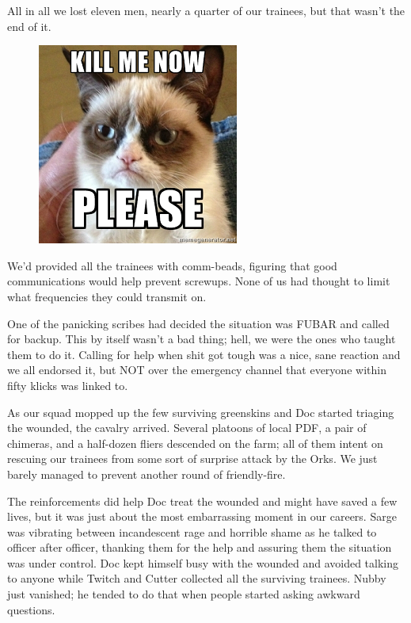All in all we lost eleven men, nearly a quarter of our trainees, but that wasn’t the end of it.

\begin{figure}
	\begin{center}
		\includegraphics[width=\figwidth]{pics/8/20.png}
	\end{center}
\end{figure}
We’d provided all the trainees with comm-beads, figuring that good communications would help prevent screwups. 
None of us had thought to limit what frequencies they could transmit on.

One of the panicking scribes had decided the situation was FUBAR and called for backup. 
This by itself wasn’t a bad thing; 
hell, we were the ones who taught them to do it. 
Calling for help when shit got tough was a nice, sane reaction and we all endorsed it, but NOT over the emergency channel that everyone within fifty klicks was linked to.

As our squad mopped up the few surviving greenskins and Doc started triaging the wounded, the cavalry arrived. 
Several platoons of local PDF, a pair of chimeras, and a half-dozen fliers descended on the farm; 
all of them intent on rescuing our trainees from some sort of surprise attack by the Orks. 
We just barely managed to prevent another round of friendly-fire.

The reinforcements did help Doc treat the wounded and might have saved a few lives, but it was just about the most embarrassing moment in our careers. 
Sarge was vibrating between incandescent rage and horrible shame as he talked to officer after officer, thanking them for the help and assuring them the situation was under control. 
Doc kept himself busy with the wounded and avoided talking to anyone while Twitch and Cutter collected all the surviving trainees. 
Nubby just vanished; 
he tended to do that when people started asking awkward questions.

